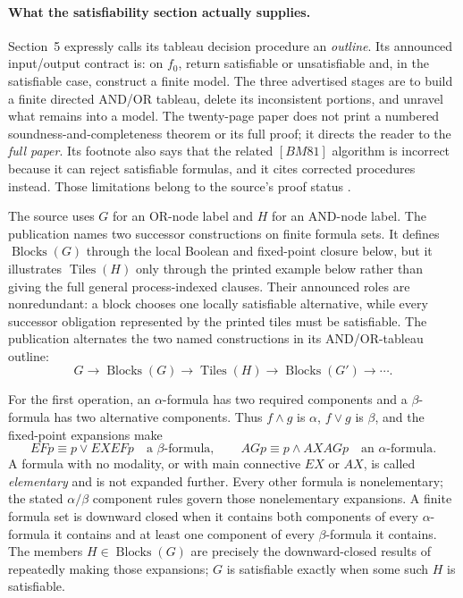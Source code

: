 \paragraph{What the satisfiability section actually supplies.}
Section~5 expressly calls its tableau decision procedure an \emph{outline}.
Its announced input/output contract is: on \(f_0\), return satisfiable or
unsatisfiable and, in the satisfiable case, construct a finite model.  The
three advertised stages are to build a finite directed AND/OR tableau, delete
its inconsistent portions, and unravel what remains into a model.  The
twenty-page paper does not print a numbered soundness-and-completeness theorem
or its full proof; it directs the reader to the \emph{full paper}.  Its
footnote also says that the related \([BM81]\) algorithm is incorrect because
it can reject satisfiable formulas, and it cites corrected procedures instead.
Those limitations belong to the source's proof status
\cite[pp.~60--63]{ClarkeEmerson1981}.

The source uses \(G\) for an OR-node label and \(H\) for an AND-node label.
The publication names two successor constructions on finite formula sets.  It
defines \(\operatorname{Blocks}(G)\) through the local Boolean and fixed-point
closure below, but it illustrates \(\operatorname{Tiles}(H)\) only through the
printed example below rather than giving the full general process-indexed
clauses.  Their announced roles are nonredundant: a block chooses one locally
satisfiable alternative, while every successor obligation represented by the
printed tiles must be satisfiable.  The publication alternates the two named
constructions in its AND/OR-tableau outline:
\[
 G\longrightarrow\operatorname{Blocks}(G)
 \longrightarrow\operatorname{Tiles}(H)
 \longrightarrow\operatorname{Blocks}(G')
 \longrightarrow\cdots.
\]

For the first operation, an \(\alpha\)-formula has two required components
and a \(\beta\)-formula has two alternative components.  Thus
\(f\land g\) is \(\alpha\), \(f\lor g\) is \(\beta\), and the fixed-point
expansions make
\[
 EFp\equiv p\lor EXEFp
 \quad\text{a }\beta\text{-formula},\qquad
 AGp\equiv p\land AXAGp
 \quad\text{an }\alpha\text{-formula}.
\]
A formula with no modality, or with main connective \(EX\) or \(AX\), is
called \emph{elementary} and is not expanded further.  Every other formula is
nonelementary; the stated \(\alpha/\beta\) component rules govern those
nonelementary expansions.  A finite formula
set is downward closed when it contains both components of every
\(\alpha\)-formula it contains and at least one component of every
\(\beta\)-formula it contains.  The members
\(H\in\operatorname{Blocks}(G)\) are precisely the downward-closed results
of repeatedly making those expansions; \(G\) is satisfiable exactly when
some such \(H\) is satisfiable.

